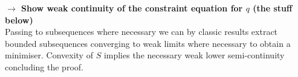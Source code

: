 \documentclass[runningheads]{llncs}
\begin{document}
\textbf{$\longrightarrow$ Show weak continuity of the constraint equation for
$q$ (the stuff below)}\\

Passing to subsequences where necessary we can by classic results
\cite{younes2010shapes} extract bounded subsequences converging to weak limits
where necessary to obtain a minimiser. Convexity of $S$ implies the necessary
weak lower semi-continuity concluding the proof.




\end{document}

